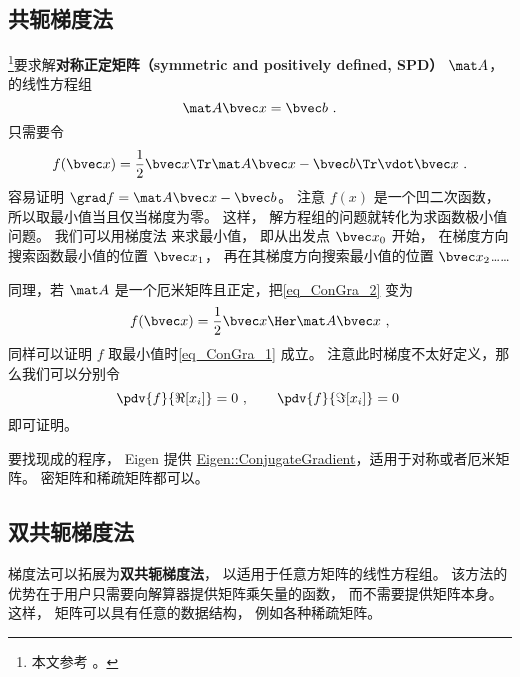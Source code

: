 
\begin{issues}
\issueDraft
\end{issues}


\subsection{共轭梯度法}

\footnote{本文参考 \cite{NR3}。}要求解\textbf{对称正定矩阵（symmetric and positively defined, SPD）} $\mat A$， 的线性方程组
\begin{equation}\label{eq_ConGra_1}
\mat A \bvec x = \bvec b~.
\end{equation}
只需要令
\begin{equation}\label{eq_ConGra_2}
f(\bvec x) = \frac{1}{2}\bvec x\Tr \mat A\bvec x - \bvec b\Tr \vdot \bvec x~.
\end{equation}
容易证明 $\grad f = \mat A \bvec x - \bvec b$。 注意 $f(x)$ 是一个凹二次函数， 所以取最小值当且仅当梯度为零。 这样， 解方程组的问题就转化为求函数极小值问题。 我们可以用梯度法%
来求最小值， 即从出发点 $\bvec x_0$ 开始， 在梯度方向搜索函数最小值的位置 $\bvec x_1$， 再在其梯度方向搜索最小值的位置 $\bvec x_2$……

同理，若 $\mat A$ 是一个厄米矩阵且正定，把\autoref{eq_ConGra_2} 变为
\begin{equation}
f(\bvec x) = \frac{1}{2}\bvec x\Her \mat A \bvec x~,
\end{equation}
同样可以证明 $f$ 取最小值时\autoref{eq_ConGra_1} 成立。 注意此时梯度不太好定义，那么我们可以分别令
\begin{equation}
\pdv{f}{\Re[x_i]} = 0~, \qquad  \pdv{f}{\Im[x_i]} = 0~
\end{equation}
即可证明。

要找现成的程序， Eigen 提供 \href{https://eigen.tuxfamily.org/dox/classEigen_1_1ConjugateGradient.html}{Eigen::ConjugateGradient}，适用于对称或者厄米矩阵。 密矩阵和稀疏矩阵都可以。

\subsection{双共轭梯度法}

梯度法可以拓展为\textbf{双共轭梯度法}， 以适用于任意方矩阵的线性方程组。 该方法的优势在于用户只需要向解算器提供矩阵乘矢量的函数， 而不需要提供矩阵本身。 这样， 矩阵可以具有任意的数据结构， 例如各种稀疏矩阵。

